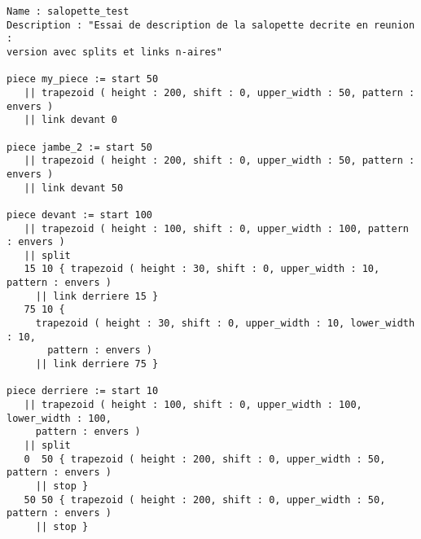 \documentclass[a4paper,10pt]{article}
\begin{document}
%

\begin{lstlisting}
Name : salopette_test
Description : "Essai de description de la salopette decrite en reunion : 
version avec splits et links n-aires"

piece my_piece := start 50
   || trapezoid ( height : 200, shift : 0, upper_width : 50, pattern : envers )
   || link devant 0

piece jambe_2 := start 50
   || trapezoid ( height : 200, shift : 0, upper_width : 50, pattern : envers )
   || link devant 50

piece devant := start 100
   || trapezoid ( height : 100, shift : 0, upper_width : 100, pattern : envers )
   || split
   15 10 { trapezoid ( height : 30, shift : 0, upper_width : 10, pattern : envers )
     || link derriere 15 }
   75 10 { 
     trapezoid ( height : 30, shift : 0, upper_width : 10, lower_width : 10, 
       pattern : envers )
     || link derriere 75 }

piece derriere := start 10
   || trapezoid ( height : 100, shift : 0, upper_width : 100, lower_width : 100, 
     pattern : envers )
   || split
   0  50 { trapezoid ( height : 200, shift : 0, upper_width : 50, pattern : envers )
     || stop }
   50 50 { trapezoid ( height : 200, shift : 0, upper_width : 50, pattern : envers )
     || stop }
\end{lstlisting}
\end{document}
